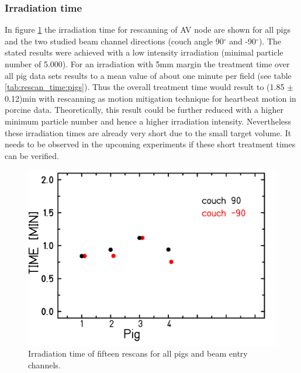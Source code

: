 \documentclass[type=dr, dr=rernat, accentcolor=tud7b,colorbacktitle, bigchapter, openright, twoside, 12pt ]{tudthesis}
\begin{document}
\subsubsection{Irradiation time}

In figure \ref{irrTime_rescan15} the irradiation time for rescanning of AV node are shown for all pigs and the two studied 
beam channel directions (couch angle 90$^{\circ}$ and -90$^{\circ}$). 
The stated results were achieved with a low intensity irradiation (minimal particle number of 5.000). For an irradiation with 5mm margin 
the treatment time over all pig data sets results to a mean value of about one minute per field (see table \ref{tab:rescan_time:pigs}). 
Thus the overall treatment time would result to (1.85 $\pm$ 0.12)min with rescanning as motion mitigation technique for heartbeat motion 
in porcine data. Theoretically, this result could be further reduced with a higher minimum particle number and hence a higher irradiation 
intensity. Nevertheless these irradiation times are already very short due to the small target volume. It needs to be observed in 
the upcoming experiments if these short treatment times can be verified. 

\vspace*{0.5cm}

 \begin{figure}[H]
 \begin{center}
 \includegraphics[scale=0.2]{Rescan15_irrTime.png}
\caption{Irradiation time of fifteen rescans for all pigs and beam entry channels.}
\label{irrTime_rescan15}
 \end{center}
\end{figure}
\end{document}
